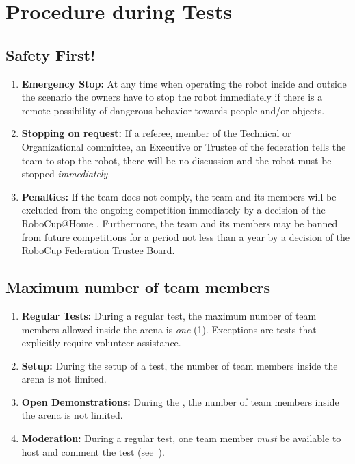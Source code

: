 \section{Procedure during Tests}

\subsection{Safety First!}
\label{rule:safetyfirst}
\begin{enumerate}
	\item \textbf{Emergency Stop:} At any time when operating the robot inside and outside the scenario the owners have to stop the robot immediately if there is a remote possibility of dangerous behavior towards people and/or objects.
	\item \textbf{Stopping on request:} If a referee, member of the Technical or Organizational committee, an Executive or Trustee of the federation tells the team to stop the robot, there will be no discussion and the robot must be stopped \emph{immediately}.
	\item \textbf{Penalties:} If the team does not comply, the team and its members will be excluded from the ongoing competition immediately by a decision of the RoboCup@Home . 	Furthermore, the team and its members may be banned from future competitions for a period not less than a year by a decision of the RoboCup Federation Trustee Board.
\end{enumerate}

\subsection{Maximum number of team members}
\label{rule:number_of_people}
\begin{enumerate}
	\item \textbf{Regular Tests:} During a regular test, the maximum number of team members allowed inside the arena is \emph{one} (1).
	Exceptions are tests that explicitly require volunteer assistance.
	\item \textbf{Setup:} During the setup of a test, the number of team members inside the arena is not limited.
	\item \textbf{Open Demonstrations:} During the , the number of team members inside the arena is not limited.
	\item \textbf{Moderation:} During a regular test, one team member \emph{must} be available to host and comment the test (see~).
\end{enumerate}

